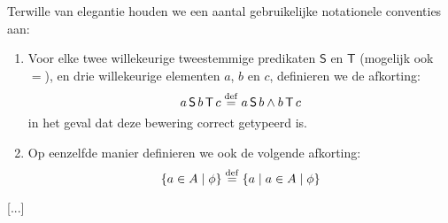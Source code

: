 Terwille van elegantie houden we een aantal gebruikelijke notationele conventies aan:

\begin{enumerate}
	\item Voor elke twee willekeurige tweestemmige predikaten $\mathsf{S}$ en $\mathsf{T}$ (mogelijk ook $=$), en drie willekeurige elementen $a$, $b$ en $c$, definieren we de afkorting: $$a \operatorname{\mathsf{S}} b \operatorname{\mathsf{T}} c \buildrel{\mathrm{def}}\over{=} a \operatorname{\mathsf{S}} b \land b \operatorname{\mathsf{T}} c$$ in het geval dat deze bewering correct getypeerd is.
	\item Op eenzelfde manier definieren we ook de volgende afkorting: $$ \{a \in A \mid \phi \} \buildrel{\mathrm{def}}\over{=} \{a \mid a \in A \mid \phi\}$$
\end{enumerate}

[...]
